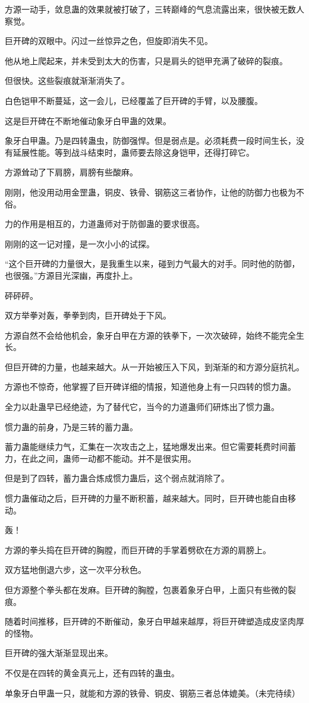 \begin{this_body}
方源一动手，敛息蛊的效果就被打破了，三转巅峰的气息流露出来，很快被无数人察觉。

巨开碑的双眼中。闪过一丝惊异之色，但旋即消失不见。

他从地上爬起来，并未受到太大的伤害，只是肩头的铠甲充满了破碎的裂痕。

但很快。这些裂痕就渐渐消失了。

白色铠甲不断蔓延，这一会儿，已经覆盖了巨开碑的手臂，以及腰腹。

这是巨开碑在不断地催动象牙白甲蛊的效果。

象牙白甲蛊。乃是四转蛊虫，防御强悍。但是弱点是。必须耗费一段时间生长，没有延展性能。等到战斗结束时，蛊师要去除这身铠甲，还得打碎它。

方源耸动了下肩膀，肩膀有些酸麻。

刚刚，他没用动用金罡蛊，铜皮、铁骨、钢筋这三者协作，让他的防御力也极为不俗。

力的作用是相互的，力道蛊师对于防御蛊的要求很高。

刚刚的这一记对撞，是一次小小的试探。

“这个巨开碑的力量很大，是我重生以来，碰到力气最大的对手。同时他的防御，也很强。”方源目光深幽，再度扑上。

砰砰砰。

双方举拳对轰，拳拳到肉，巨开碑处于下风。

方源自然不会给他机会，象牙白甲在方源的铁拳下，一次次破碎，始终不能完全生长。

但巨开碑的力量，也越来越大。从一开始被压入下风，到渐渐的和方源分庭抗礼。

方源也不惊奇，他掌握了巨开碑详细的情报，知道他身上有一只四转的惯力蛊。

全力以赴蛊早已经绝迹，为了替代它，当今的力道蛊师们研炼出了惯力蛊。

惯力蛊的前身，乃是三转的蓄力蛊。

蓄力蛊能继续力气，汇集在一次攻击之上，猛地爆发出来。但它需要耗费时间蓄力，在此之间，蛊师一动都不能动。并不是很实用。

但是到了四转，蓄力蛊合炼成惯力蛊后，这个弱点就消除了。

惯力蛊催动之后，巨开碑的力量不断积蓄，越来越大。同时，巨开碑也能自由移动。

轰！

方源的拳头捣在巨开碑的胸膛，而巨开碑的手掌着劈砍在方源的肩膀上。

双方猛地倒退六步，这一次平分秋色。

但方源整个拳头都在发麻。巨开碑的胸膛，包裹着象牙白甲，上面只有些微的裂痕。

随着时间推移，巨开碑的不断催动，象牙白甲越来越厚，将巨开碑塑造成皮坚肉厚的怪物。

巨开碑的强大渐渐显现出来。

不仅是在四转的黄金真元上，还有四转的蛊虫。

单象牙白甲蛊一只，就能和方源的铁骨、铜皮、钢筋三者总体媲美。（未完待续）

\end{this_body}

